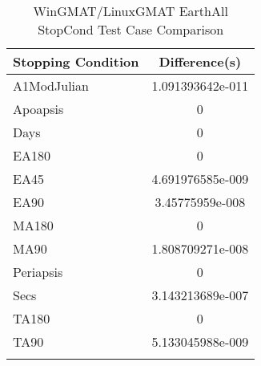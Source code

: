 \begin{table}[htbp!]
\centering
\caption{ WinGMAT/LinuxGMAT EarthAll StopCond Test Case Comparison}
      \begin{tabular}{lc}
      \hline\hline
          Stopping Condition & Difference(s) \\
         \hline
         A1ModJulian & 1.091393642e-011 \\
         Apoapsis & 0 \\
         Days & 0 \\
         EA180 & 0 \\
         EA45 & 4.691976585e-009 \\
         EA90 & 3.45775959e-008 \\
         MA180 & 0 \\
         MA90 & 1.808709271e-008 \\
         Periapsis & 0 \\
         Secs & 3.143213689e-007 \\
         TA180 & 0 \\
         TA90 & 5.133045988e-009 \\
      \hline\hline
      \label{Table: WinGMAT-LinuxGMAT EarthAll StopCond Table} 
\end{tabular}
\end{table}
